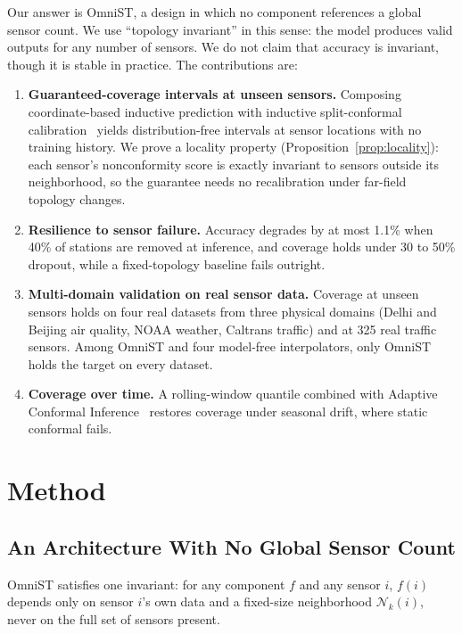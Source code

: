 \documentclass[journal,twoside,web]{ieeecolor}
\begin{document}
Our answer is OmniST, a design in which no component references a global sensor count. We use
``topology invariant'' in this sense: the model produces valid outputs for any number of sensors. We
do not claim that accuracy is invariant, though it is stable in practice. The contributions are:
\begin{enumerate}
\item \textbf{Guaranteed-coverage intervals at unseen sensors.} Composing coordinate-based inductive
prediction with inductive split-conformal calibration~\cite{conformalinductivegnn2024} yields
distribution-free intervals at sensor locations with no training history. We prove a locality
property (Proposition~\ref{prop:locality}): each sensor's nonconformity score is exactly invariant to
sensors outside its neighborhood, so the guarantee needs no recalibration under far-field topology
changes.
\item \textbf{Resilience to sensor failure.} Accuracy degrades by at most 1.1\% when 40\% of
stations are removed at inference, and coverage holds under 30 to 50\% dropout, while a
fixed-topology baseline fails outright.
\item \textbf{Multi-domain validation on real sensor data.} Coverage at unseen sensors holds on four
real datasets from three physical domains (Delhi and Beijing air quality, NOAA weather, Caltrans
traffic) and at 325 real traffic sensors. Among OmniST and four model-free interpolators, only
OmniST holds the target on every dataset.
\item \textbf{Coverage over time.} A rolling-window quantile combined with Adaptive Conformal
Inference~\cite{gibbs2021aci} restores coverage under seasonal drift, where static conformal fails.
\end{enumerate}

\section{Method}
\label{sec:architecture}

\subsection{An Architecture With No Global Sensor Count}

OmniST satisfies one invariant: for any component $f$ and any sensor $i$, $f(i)$ depends only on
sensor $i$'s own data and a fixed-size neighborhood $\mathcal{N}_k(i)$, never on the full set of
sensors present.
\end{document}
